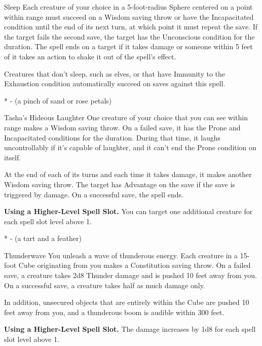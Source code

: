 \begin{Spell}[
    tags=Concentration,
    level=1st,
    time=1 Action,
    range=60 ft. (5 ft. sphere),
    components={V, S, M*},
    duration=1 Minute,
    school=Enchantment,
    attack=WIS Save,
    effect=Incapacitated
]{Sleep}
Each creature of your choice in a 5-foot-radius Sphere centered on a point within range must succeed on a Wisdom saving throw or have the Incapacitated condition until the end of its next turn, at which point it must repeat the save. If the target fails the second save, the target has the Unconscious condition for the duration. The spell ends on a target if it takes damage or someone within 5 feet of it takes an action to shake it out of the spell's effect.

Creatures that don't sleep, such as elves, or that have Immunity to the Exhaustion condition automatically succeed on saves against this spell.

* - (a pinch of sand or rose petals)
\end{Spell}


\begin{Spell}[
    level=1st,
    time=1 Action,
    range=30 ft.,
    components={V, S, M*},
    duration=Concentration 1 Minute,
    school=Enchantment,
    attack=WIS Save,
    effect=Prone
]{Tasha's Hideous Laughter}
One creature of your choice that you can see within range makes a Wisdom saving throw. On a failed save, it has the Prone and Incapacitated conditions for the duration. During that time, it laughs uncontrollably if it's capable of laughter, and it can't end the Prone condition on itself.

At the end of each of its turns and each time it takes damage, it makes another Wisdom saving throw. The target has Advantage on the save if the save is triggered by damage. On a successful save, the spell ends.

\textbf{Using a Higher-Level Spell Slot.} You can target one additional creature for each spell slot level above 1.

* - (a tart and a feather)
\end{Spell}


\begin{Spell}[
    level=1st,
    time=1 Action,
    range=Self (15 ft.),
    components={V, S},
    duration=Instantaneous,
    school=Evocation,
    attack=CON Save,
    effect=Thunder
]{Thunderwave}
You unleash a wave of thunderous energy. Each creature in a 15-foot Cube originating from you makes a Constitution saving throw. On a failed save, a creature takes 2d8 Thunder damage and is pushed 10 feet away from you. On a successful save, a creature takes half as much damage only.

In addition, unsecured objects that are entirely within the Cube are pushed 10 feet away from you, and a thunderous boom is audible within 300 feet.

\textbf{Using a Higher-Level Spell Slot.} The damage increases by 1d8 for each spell slot level above 1.
\end{Spell}


